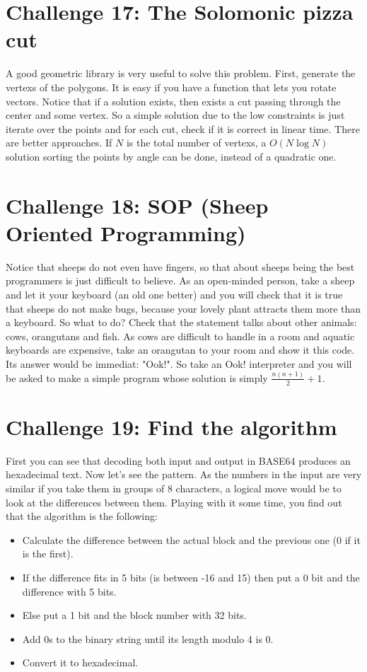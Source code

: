 \documentclass[english,12pt,a4paper]{article}
\begin{document}
\section{Challenge 17: The Solomonic pizza cut}
A good geometric library is very useful to solve this problem. First, generate the vertexs of the polygons. It is easy if you have a function that lets you rotate vectors. Notice that if a solution exists, then exists a cut passing through the center and some vertex. So a simple solution due to the low constraints is just iterate over the points and for each cut, check if it is correct in linear time. There are better approaches. If $N$ is the total number of vertexs, a $O(N\log N)$ solution sorting the points by angle can be done, instead of a quadratic one.

\newpage

\section{Challenge 18: SOP (Sheep Oriented Programming)}
Notice that sheeps do not even have fingers, so that about sheeps being the best programmers is just difficult to believe. As an open-minded person, take a sheep and let it your keyboard (an old one better) and you will check that it is true that sheeps do not make bugs, because your lovely plant attracts them more than a keyboard. So what to do? Check that the statement talks about other animals: cows, orangutans and fish. As cows are difficult to handle in a room and aquatic keyboards are expensive, take an orangutan to your room and show it this code. Its answer would be immediat: "Ook!". So take an Ook! interpreter and you will be asked to make a simple program whose solution is simply $\frac{n(n + 1)}{2} + 1$.

\newpage

\section{Challenge 19: Find the algorithm}
First you can see that decoding both input and output in BASE64 produces an hexadecimal text. Now let's see the pattern. As the numbers in the input are very similar if you take them in groups of 8 characters, a logical move would be to look at the differences between them. Playing with it some time, you find out that the algorithm is the following:
\begin{itemize}
\item Calculate the difference between the actual block and the previous one (0 if it is the first).
\item If the difference fits in 5 bits (is between -16 and 15) then put a 0 bit and the difference with 5 bits.
\item Else put a 1 bit and the block number with 32 bits.
\item Add 0s to the binary string until its length modulo 4 is 0.
\item Convert it to hexadecimal.
\end{itemize}
\end{document}
